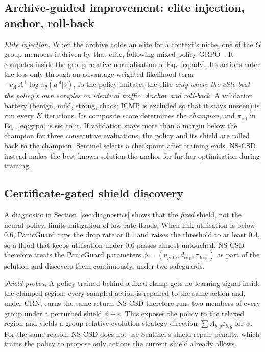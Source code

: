 \subsection{Archive-guided improvement: elite injection, anchor, roll-back}
\label{sec:anchor}
\emph{Elite injection.} When the archive holds an elite for a context's niche,
one of the $G$ group members is driven by that elite, following mixed-policy
GRPO~\cite{yan2025luffy}. It competes inside the group-relative normalisation
of Eq.~\eqref{eq:adv}. Its actions enter the loss only through an
advantage-weighted likelihood term $-c_{\text{el}}\,A^{+}\log\pi_\theta(a^{\text{el}}|s)$,
so the policy imitates the elite \emph{only where the elite beat the policy's
own samples on identical traffic}.
\emph{Anchor and roll-back.} A validation battery (benign, mild, strong,
chaos; ICMP is excluded so that it stays unseen) is run every $K$ iterations.
Its composite score determines the \emph{champion}, and $\pi_{\text{ref}}$ in
Eq.~\eqref{eq:grpo} is set to it. If validation stays more than a margin below
the champion for three consecutive evaluations, the policy and its shield are
rolled back to the champion. Sentinel selects a checkpoint after training
ends. NS-CSD instead makes the best-known solution the anchor for further
optimisation during training.

\subsection{Certificate-gated shield discovery}
\label{sec:shielddisc}
A diagnostic in Section~\ref{sec:diagnostics} shows that the \emph{fixed}
shield, not the neural policy, limits mitigation of low-rate floods. When link
utilisation is below 0.6, PanicGuard caps the drop rate at 0.1 and raises the
threshold to at least 0.4, so a flood that keeps utilisation under 0.6 passes
almost untouched. NS-CSD therefore treats the PanicGuard parameters
$\phi=(u_{\text{gate}},d_{\text{cap}},\tau_{\text{floor}})$ as part of the
solution and discovers them continuously, under two safeguards.

\emph{Shield probes.} A policy trained behind a fixed clamp gets no learning
signal inside the clamped region: every sampled action is repaired to the same
action and, under CRN, earns the same return. NS-CSD therefore runs two members
of every group under a perturbed shield $\phi+\varepsilon$. This exposes the
policy to the relaxed region and yields a group-relative evolution-strategy
direction $\sum A_{b,g}\varepsilon_{b,g}$ for $\phi$. For the same reason, NS-CSD
does not use Sentinel's shield-repair penalty, which trains the policy to
propose only actions the current shield already allows.

